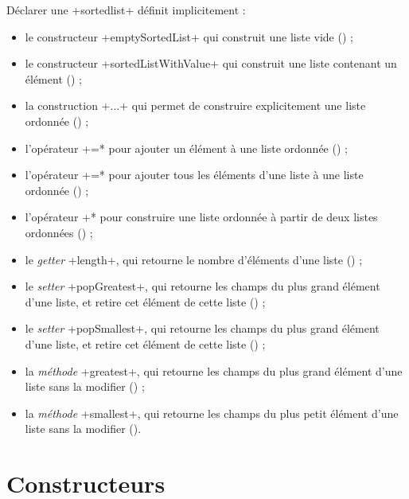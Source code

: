 Déclarer une \ggst+sortedlist+ définit implicitement :
\begin{itemize}
  \item le constructeur \ggst+emptySortedList+ qui construit une liste vide () ;
  \item le constructeur \ggst+sortedListWithValue+ qui construit une liste contenant un élément () ;
  \item la construction \ggst+{...}+ qui permet de construire explicitement une liste ordonnée () ;
  \item l'opérateur \ggst*+=* pour ajouter un élément à une liste ordonnée () ;
  \item l'opérateur \ggst*+=* pour ajouter tous les éléments d'une liste à une liste ordonnée () ;
  \item l'opérateur \ggst*+* pour construire une liste ordonnée à partir de deux listes ordonnées () ;
  \item le \emph{getter} \ggst+length+, qui retourne le nombre d'éléments d'une liste () ;
  \item le \emph{setter} \ggst+popGreatest+, qui retourne les champs du plus grand élément d'une liste, et retire cet élément de cette liste () ;
  \item le \emph{setter} \ggst+popSmallest+, qui retourne les champs du plus grand élément d'une liste, et retire cet élément de cette liste () ;
  \item la \emph{méthode} \ggst+greatest+, qui retourne les champs du plus grand élément d'une liste sans la modifier () ;
  \item la \emph{méthode} \ggst+smallest+, qui retourne les champs du plus petit élément d'une liste sans la modifier ().
\end{itemize}








\section{Constructeurs}

